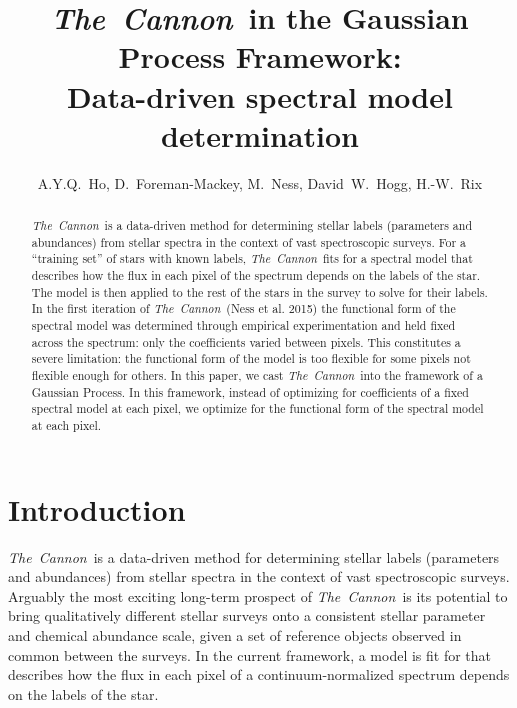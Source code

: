 \documentclass[12pt, preprint]{aastex}
\newcommand{\tc}{\textsl{The~Cannon}}
\begin{document}
\title{\tc\ in the Gaussian Process Framework: \\ Data-driven spectral
model determination}
\author{A.Y.Q.~Ho,
D.~Foreman-Mackey,
M.~Ness,
David~W.~Hogg, 
H.-W.~Rix
}


\begin{abstract}

\tc\ is a data-driven method for determining stellar labels (parameters and 
abundances) from stellar spectra in the context of vast spectroscopic surveys. 
For a ``training set'' of stars with known labels, \tc\ fits for a spectral 
model that describes how the flux in each pixel of the spectrum depends on the 
labels of the star. The model is then applied to the rest of the stars in the 
survey to solve for their labels. 
In the first iteration of \tc\ (Ness et al. 2015) the functional form of the 
spectral model was determined through empirical experimentation and held fixed
across the spectrum: only the coefficients varied between pixels. 
This constitutes a severe limitation: the functional form of the model is too 
flexible for some pixels 
not flexible enough for others. In this paper, we cast \tc\ into the framework
of a Gaussian Process. In this framework, instead of optimizing for 
coefficients of a fixed spectral model at each pixel, we optimize for the
functional form of the spectral model at each pixel. 

\end{abstract}


\section{Introduction}

\tc\ is a data-driven method for determining stellar labels (parameters and 
abundances) from stellar
spectra in the context of vast spectroscopic surveys. Arguably the most
exciting long-term prospect of \tc\ is its potential to bring qualitatively
different stellar surveys onto a consistent stellar parameter and chemical
abundance scale, given a set of reference objects observed in common between
the surveys. In the current framework, a model is fit for that describes
how the flux in each pixel of a continuum-normalized spectrum depends
on the labels of the star.
\end{document}
